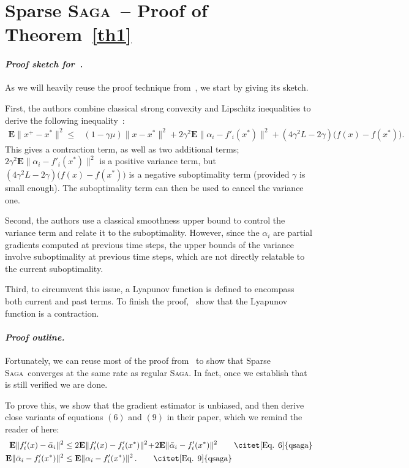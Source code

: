 \documentclass[twoside, 11pt]{article}
\newcommand{\stepsize}{\gamma}
\newcommand{\strongconvex}{\mu}
\newcommand{\lipschitz}{L}
\newcommand{\Econd}{\mathbf{E}}
\newcommand{\SAGA}{\textsc{Saga}}
\begin{document}
\section{Sparse \SAGA\ -- Proof of Theorem~\ref{th1}}\label{apxA}
\paragraph{\textit{Proof sketch for~\citet{qsaga}.}}
As we will heavily reuse the proof technique from~\citet{qsaga}, we start by giving its sketch.

First, the authors combine classical strong convexity and Lipschitz inequalities to derive the following inequality~\citep[Lemma~1]{qsaga}:
\begin{align}\label{eq:sparseappendix}
\Econd \|x^{+} \! - \!x^*\|^2 \leq
&(1 \! - \! \stepsize\strongconvex) \|x \! -\! x^*\|^2
+ 2\stepsize^2 \Econd \|\alpha_i - f'_i(x^*)\|^2
+ (4 \stepsize^2 \lipschitz-2\stepsize)\big(f(x) - f(x^*)\big).
\end{align}
This gives a contraction term, as well as two additional terms; $2\stepsize^2 \Econd \|\alpha_i - f'_i(x^*)\|^2$ is a positive variance term, but $(4 \stepsize^2 \lipschitz-2\stepsize)\big(f(x) - f(x^*)\big)$ is a negative suboptimality term (provided $\stepsize$ is small enough).
The suboptimality term can then be used to cancel the variance one.

Second, the authors use a classical smoothness upper bound to control the variance term and relate it to the suboptimality.
However, since the $\alpha_i$ are partial gradients computed at previous time steps, the upper bounds of the variance involve suboptimality at previous time steps, which are not directly relatable to the current suboptimality.

Third, to circumvent this issue, a Lyapunov function is defined to encompass both current and past terms.
To finish the proof,~\citet{qsaga} show that the Lyapunov function is a contraction.

	\paragraph{\textit{Proof outline.}}\label{sparseoutlineappendix}
	Fortunately, we can reuse most of the proof from~\citet{qsaga} to show that Sparse \SAGA\ converges at the same rate as regular \SAGA.
	In fact, once we establish that \citet[Lemma~1]{qsaga} is still verified we are done.

	To prove this, we show that the gradient estimator is unbiased, and then derive close variants of equations $(6)$ and $(9)$ in their paper, which we remind the reader of here:
	\begin{align}
	\Econd \|f'_i(x) - \bar \alpha_i\|^2 &\leq 2\Econd \|f'_i(x) - f'_i(x^*)\|^2 \!+\! 2 \Econd \|\bar \alpha_i - f'_i(x^*)\|^2
	\tag*{\citet[Eq. 6]{qsaga}}
	\\
	\Econd \|\bar \alpha_i - f'_i(x^*)\|^2 &\leq \Econd \|\alpha_i - f'_i(x^*)\|^2 \, .
	\tag*{\citet[Eq. 9]{qsaga}}
	\end{align}
\end{document}

